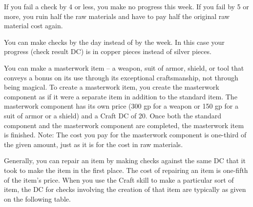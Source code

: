 If you fail a check by 4 or less, you make no progress this week. If you fail by 5 or more, you ruin half the raw materials and have to pay half the original raw material cost again.

 You can make checks by the day instead of by the week. In this case your progress (check result \mtimes DC) is in copper pieces instead of silver pieces.

 You can make a masterwork item -- a weapon, suit of armor, shield, or tool that conveys a bonus on its use through its exceptional craftsmanship, not through being magical. To create a masterwork item, you create the masterwork component as if it were a separate item in addition to the standard item. The masterwork component has its own price (300 gp for a weapon or 150 gp for a suit of armor or a shield) and a Craft DC of 20. Once both the standard component and the masterwork component are completed, the masterwork item is finished. Note: The cost you pay for the masterwork component is one-third of the given amount, just as it is for the cost in raw materials.

 Generally, you can repair an item by making checks against the same DC that it took to make the item in the first place. The cost of repairing an item is one-fifth of the item's price. When you use the Craft skill to make a particular sort of item, the DC for checks involving the creation of that item are typically as given on the following table.

